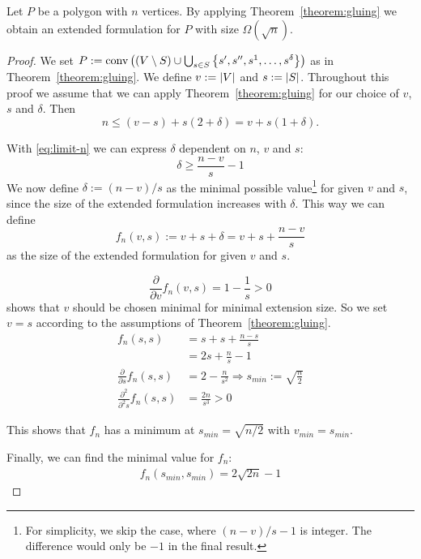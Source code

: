 \begin{observation}\label{observation:limits-of-gluing}
  Let $P$ be a polygon with $n$ vertices. By applying Theorem~\ref{theorem:gluing} we obtain an extended formulation for $P$ with size $\Omega(\sqrt{n})$.
\end{observation}
\begin{proof}
  We set $P := \operatorname{conv}\left( (V \setminus S) \cup \bigcup_{s \in S} \left\{ s',s'',s^1,\dots,s^\delta \right\} \right)$ as in Theorem~\ref{theorem:gluing}. We define $v := \lvert V\rvert$ and $s := \lvert S\rvert$. Throughout this proof we assume that we can apply Theorem~\ref{theorem:gluing} for our choice of $v$, $s$ and $\delta$. Then
  \begin{equation}\label{eq:limit-n}
    n \leq (v-s) + s(2+\delta) = v + s(1+\delta).
  \end{equation}

  With \eqref{eq:limit-n} we can express $\delta$ dependent on $n$, $v$ and $s$:
  \begin{equation*}
    \delta \geq \frac{n-v}{s} - 1
  \end{equation*}
  We now define $\delta := (n-v)/s$ as the minimal possible value\footnote{For simplicity, we skip the case, where $(n-v)/s - 1$ is integer. The difference would only be $-1$ in the final result.} for given $v$ and $s$, since the size of the extended formulation increases with $\delta$. This way we can define $$f_n(v,s) := v + s + \delta = v + s + \frac{n-v}{s}$$ as the size of the extended formulation for given $v$ and $s$.

  $$\frac{\partial}{\partial v} f_n(v,s) = 1 - \frac{1}{s} > 0$$ shows that $v$ should be chosen minimal for minimal extension size. So we set $v = s$ according to the assumptions of Theorem~\ref{theorem:gluing}.
  \begin{align*}
    f_n(s, s)                                & = s + s + \frac{n-s}{s}                                       \\
                                             & = 2s + \frac{n}{s} - 1                                        \\
    \frac{\partial}{\partial s} f_n(s,s)     & = 2 - \frac{n}{s^2} \Rightarrow s_{min} := \sqrt{\frac{n}{2}} \\
    \frac{\partial^2}{\partial^2 s} f_n(s,s) & = \frac{2n}{s^3} > 0
  \end{align*}

  This shows that $f_n$ has a minimum at $s_{min} = \sqrt{n/2}$ with $v_{min}=s_{min}$.

  Finally, we can find the minimal value for $f_n$:
  \begin{align*}
    f_n(s_{min}, s_{min}) = 2\sqrt{2n} - 1
  \end{align*}
\end{proof}



